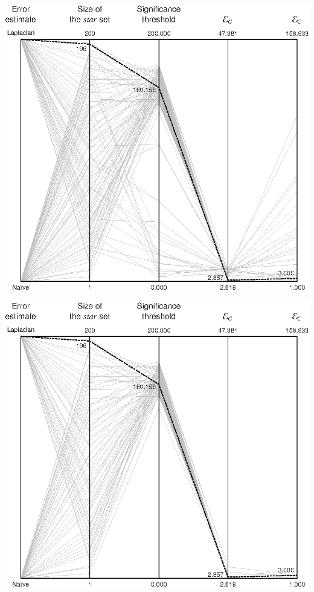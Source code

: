 \documentclass{article}
\begin{document}
\centerline{\includegraphics{cn2_monks3_generalization.ps}}

\centerline{\includegraphics{cn2_monks3_conditions.ps}}
\end{document}
